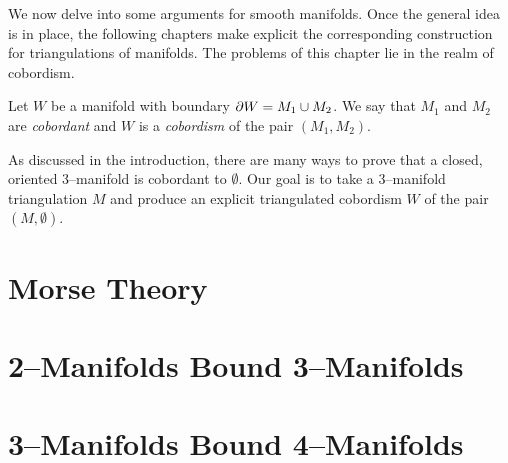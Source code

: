 \label{cha:cobordisms}

We now delve into some arguments for smooth manifolds.
Once the general idea is in place, the following chapters make explicit the corresponding construction for triangulations of manifolds.
The problems of this chapter lie in the realm of cobordism.
\begin{defn}
  \label{def:cobordism}
  Let $W$ be a manifold with boundary $\partial W=M_1\cup M_2$.
  We say that $M_1$ and $M_2$ are \emph{cobordant} and $W$ is a \emph{cobordism} of the pair $(M_1,M_2)$.
\end{defn}
As discussed in the introduction, there are many ways to prove that a closed, oriented 3--manifold is cobordant to $\emptyset$.
Our goal is to take a 3--manifold triangulation $M$ and produce an explicit triangulated cobordism $W$ of the pair $(M,\emptyset)$.

\section{Morse Theory}


\section{2--Manifolds Bound 3--Manifolds}


\section{3--Manifolds Bound 4--Manifolds}


%
